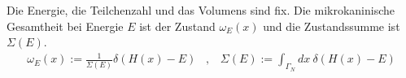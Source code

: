 
\begin{definition}
    Die Energie, die Teilchenzahl und das Volumens sind fix.
    Die mikrokaninische Gesamtheit bei Energie $E$ ist der Zustand
    $\omega_E (x)$ und die Zustandssumme ist $\Sigma(E)$.
    \begin{align*}
        \omega_E(x) := \frac{1}{\Sigma (E)} \delta(H(x)-E)
        \hspace{10pt} , \hspace{10pt}
        \Sigma(E) := \int_{\Gamma_N} dx \ \delta(H(x)-E)
    \end{align*}
\end{definition}



